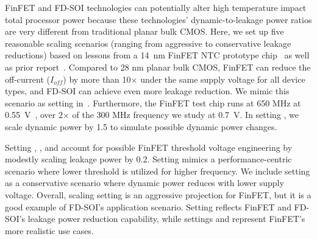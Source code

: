 \begin{table}[t]
\centering
{}
  \caption{FinFET and FD-SOI scaling settings: for completeness, we scale dynamic and leakage power with different factors to cover both aggressive and conservative scenarios.} 
  \label{table:scaling-setting} 
\end{table}

FinFET and FD-SOI technologies can potentially alter high temperature impact total processor power because these technologies' dynamic-to-leakage power ratios are very different from traditional planar bulk CMOS. Here, we set up five reasonable scaling scenarios (ranging from aggressive to conservative leakage reductions) based on lessons from a 14~nm FinFET NTC prototype chip~\cite{rachala2016amdntc} as well as prior report~\cite{pelloux2012planar}. Compared to 28 nm planar bulk CMOS, FinFET can reduce the off-current ($I_{off}$) by more than 10$\times$ under the same supply voltage for all device types, and FD-SOI can achieve even more leakage reduction. We mimic this scenario as setting  in~. Furthermore, the FinFET test chip runs at 650 MHz at 0.55~V~\cite{rachala2016amdntc}, over 2$\times$ of the 300 MHz frequency we study at 0.7~V. In setting , we scale dynamic power by 1.5 to simulate possible dynamic power changes.

Setting , , and  account for possible FinFET threshold voltage engineering by modestly scaling leakage power by 0.2. Setting  mimics a performance-centric scenario where lower threshold is utilized for higher frequency. We include setting  as a conservative scenario where dynamic power reduces with lower supply voltage. Overall, scaling setting  is an aggressive projection for FinFET, but it is a good example of FD-SOI's application scenario. Setting  reflects FinFET and FD-SOI's leakage power reduction capability, while settings  and  represent FinFET's more realistic use cases. 


